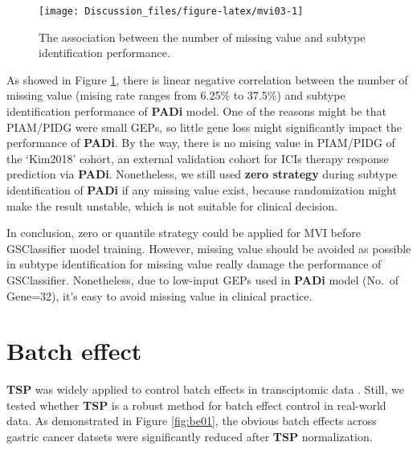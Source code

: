 \documentclass[
  12pt,
]{book}
\begin{document}
\begin{figure}

{\centering \texttt{[image: Discussion\_files/figure-latex/mvi03-1]} 

}

\caption{The association between the number of missing value and subtype identification performance.}\label{fig:mvi03}
\end{figure}

As showed in Figure \ref{fig:mvi03}, there is linear negative correlation between the number of missing value (mising rate ranges from 6.25\% to 37.5\%) and subtype identification performance of \textbf{PADi} model. One of the reasons might be that PIAM/PIDG were small GEPs, so little gene loss might significantly impact the performance of \textbf{PADi}. By the way, there is no mising value in PIAM/PIDG of the `Kim2018' cohort, an external validation cohort for ICIs therapy response prediction via \textbf{PADi}. Nonetheless, we still used \textbf{zero strategy} during subtype identification of \textbf{PADi} if any missing value exist, because randomization might make the result unstable, which is not suitable for clinical decision.

In conclusion, zero or quantile strategy could be applied for MVI before GSClassifier model training. However, missing value should be avoided as possible in subtype identification for missing value really damage the performance of GSClassifier. Nonetheless, due to low-input GEPs used in \textbf{PADi} model (No.~of Gene=32), it's easy to avoid missing value in clinical practice.

\hypertarget{batch-effect}{%
\section{Batch effect}\label{batch-effect}}

\textbf{TSP} was widely applied to control batch effects in transciptomic data \citep{RN369, RN367, RN368, RN364, RN363, RN362, RN366, RN365}. Still, we tested whether \textbf{TSP} is a robust method for batch effect control in real-world data. As demonstrated in Figure \ref{fig:be01}, the obvious batch effects across gastric cancer datsets were significantly reduced after \textbf{TSP} normalization.
\end{document}
